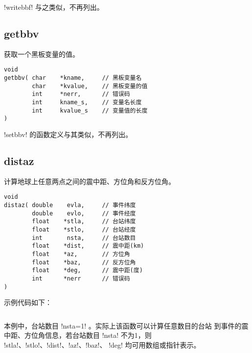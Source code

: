 !writebbf! 与之类似，不再列出。

\subsection{getbbv}
获取一个黑板变量的值。
\begin{verbatim}
void
getbbv( char    *kname,     // 黑板变量名
        char    *kvalue,    // 黑板变量的值
        int     *nerr,      // 错误码
        int     kname_s,    // 变量名长度
        int     kvalue_s    // 变量值的长度
)
\end{verbatim}
!setbbv! 的函数定义与其类似，不再列出。

\subsection{distaz}
计算地球上任意两点之间的震中距、方位角和反方位角。
\begin{verbatim}
void
distaz( double    evla,     // 事件纬度
        double    evlo,     // 事件经度
        float    *stla,     // 台站纬度
        float    *stlo,     // 台站经度
        int       nsta,     // 台站数目
        float    *dist,     // 震中距(km)
        float    *az,       // 方位角
        float    *baz,      // 反方位角
        float    *deg,      // 震中距(度)
        int      *nerr      // 错误码
)
\end{verbatim}
示例代码如下：
\inputminted{c}{./libs/distaz.c}
本例中，台站数目 !nsta=1! 。实际上该函数可以计算任意数目的台站
到事件的震中距、方位角信息，若台站数目 !nsta! 不为1，则
!stla!、!stlo!、!dist!、!az!、!baz!、
!deg! 均可用数组或指针表示。
